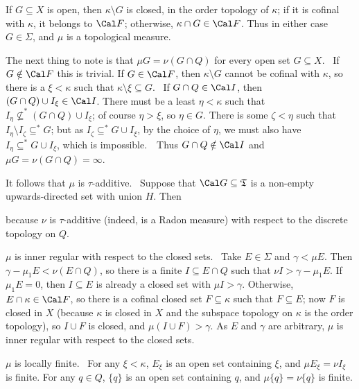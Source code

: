 { If $G\subseteq X$ is open, then $\kappa\setminus G$ is
closed, in the order topology of $\kappa$;  if it is cofinal with
$\kappa$, it belongs to $\Cal F$;  otherwise, $\kappa\cap G\in\Cal F$.
Thus in either case $G\in\Sigma$, and $\mu$ is a topological measure.

\medskip

 The next thing to note is that $\mu G=\nu(G\cap Q)$ for
every open set $G\subseteq X$.   \Prf\ If $G\notin\Cal F$ this is
trivial.   If $G\in\Cal F$, then $\kappa\setminus G$ cannot be cofinal
with $\kappa$, so there is a $\xi<\kappa$ such that
$\kappa\setminus\xi\subseteq G$.
\Quer\ If $G\cap Q\in\Cal I$, then $(G\cap Q)\cup I_{\xi}\in\Cal I$.
There must be a least $\eta<\kappa$ such that
$I_{\eta}\not\subseteq^*(G\cap Q)\cup I_{\xi}$;  of course $\eta>\xi$,
so $\eta\in G$.   There is some $\zeta<\eta$ such that
$I_{\eta}\setminus I_{\zeta}\subseteq^*G$;  but as
$I_{\zeta}\subseteq^*G\cup I_{\xi}$, by the choice of $\eta$, we must
also have $I_{\eta}\subseteq^*G\cup I_{\xi}$,
which is impossible.\ \BanG\   Thus $G\cap Q\notin\Cal I$ and $\mu
G=\nu(G\cap Q)=\infty$.\ \Qed

\medskip

 It follows that $\mu$ is $\tau$-additive.   \Prf\ Suppose
that $\Cal G\subseteq\frak T$ is a non-empty upwards-directed set with
union $H$.   Then


\noindent because $\nu$ is $\tau$-additive (indeed, is a Radon measure)
with respect to the discrete topology on $Q$.\ \Qed

\medskip

 $\mu$ is inner regular with respect to the closed sets.
\Prf\ Take $E\in\Sigma$ and $\gamma<\mu E$.   Then
$\gamma-\mu_1E<\nu(E\cap Q)$, so there is a finite
$I\subseteq E\cap Q$ such that $\nu I>\gamma-\mu_1E$.   If
$\mu_1E=0$, then $I\subseteq E$ is already a closed set with
$\mu I>\gamma$.   Otherwise, $E\cap\kappa\in\Cal F$, so there is a
cofinal closed
set $F\subseteq\kappa$ such that $F\subseteq E$;  now $F$ is closed in
$X$ (because $\kappa$ is closed in $X$ and the subspace topology on
$\kappa$ is the order topology), so $I\cup F$ is closed, and
$\mu(I\cup F)>\gamma$.   As $E$ and $\gamma$ are arbitrary,
$\mu$ is inner regular with respect to the closed sets.\ \Qed

\medskip

 $\mu$ is locally finite.   \Prf\ For any $\xi<\kappa$,
$E_{\xi}$ is an open set containing $\xi$, and $\mu E_{\xi}=\nu I_{\xi}$
is finite.   For any $q\in Q$, $\{q\}$ is an open set containing $q$,
and $\mu\{q\}=\nu\{q\}$ is finite. \Qed

}
